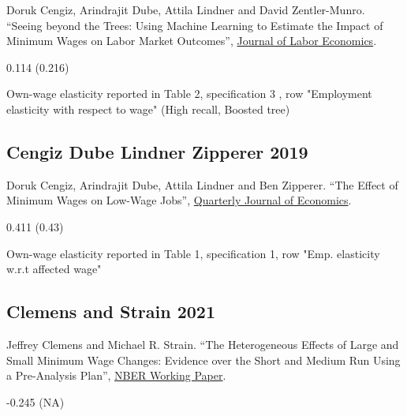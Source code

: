 \noindent Doruk Cengiz, Arindrajit Dube, Attila Lindner and David Zentler-Munro. ``Seeing beyond the Trees: Using Machine Learning to Estimate the Impact of Minimum Wages on Labor Market Outcomes'', \href{https://doi.org/10.1086/718497}{Journal of Labor Economics}.

\vspace{0.7em}

 0.114 (0.216)

\vspace{0.7em}

 Own-wage elasticity reported in Table 2, specification 3 , row "Employment elasticity with respect to wage" (High recall, Boosted tree)

\subsection*{Cengiz Dube Lindner Zipperer 2019}
\vspace{-0.7em}

\noindent Doruk Cengiz, Arindrajit Dube, Attila Lindner and Ben Zipperer. ``The Effect of Minimum Wages on Low-Wage Jobs'', \href{https://doi.org/10.1093/qje/qjz014}{Quarterly Journal of Economics}.

\vspace{0.7em}

 0.411 (0.43)

\vspace{0.7em}

 Own-wage elasticity reported in Table 1, specification 1, row "Emp. elasticity w.r.t affected wage"

\subsection*{Clemens and Strain 2021}
\vspace{-0.7em}

\noindent Jeffrey Clemens and Michael R. Strain. ``The Heterogeneous Effects of Large and Small Minimum Wage Changes: Evidence over the Short and Medium Run Using a Pre-Analysis Plan'', \href{https://www.nber.org/system/files/working_papers/w29264/w29264.pdf}{NBER Working Paper}.

\vspace{0.7em}

 -0.245 (NA)

